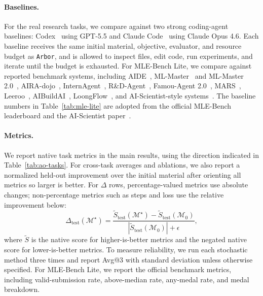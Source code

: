 \documentclass[]{selfevolagent}
\theoremstyle{plain}
\theoremstyle{definition}
\theoremstyle{remark}
\newcommand{\arbor}{\texttt{Arbor}}
\newcommand{\Mat}{\mathcal{M}}
\newcommand{\test}{\mathrm{test}}
\begin{document}
\paragraph{Baselines.}
For the real research tasks, we compare against two strong coding-agent
baselines: Codex~\citep{codex} using GPT-5.5 and Claude Code~\citep{claudecode} using Claude Opus 4.6. Each
baseline receives the same initial material, objective, evaluator, and resource
budget as \arbor{}, and is allowed to inspect files, edit code, run experiments,
and iterate until the budget is exhausted. For MLE-Bench Lite, we compare
against reported benchmark systems, including AIDE~\citep{aide},
ML-Master~\citep{mlmaster} and ML-Master 2.0~\citep{mlmaster2},
AIRA-dojo~\citep{airadojo}, InternAgent~\citep{internagent},
R\&D-Agent~\citep{rdagent}, Famou-Agent 2.0~\citep{famouagent},
MARS~\citep{mars}, Leeroo~\citep{kapso},
AIBuildAI~\citep{aibuildai}, LoongFlow~\citep{loongflow}, and
AI-Scientist-style systems~\citep{aiscientist,aiscientist_long}. The baseline numbers in Table~\ref{tab:mle-lite} are adopted from the
official MLE-Bench leaderboard and the AI-Scientist paper~\cite{aiscientist_long}.

\paragraph{Metrics.}
We report native task metrics in the main results, using the direction indicated
in Table~\ref{tab:ao-tasks}. For cross-task averages and ablations, we also
report a normalized held-out improvement over the initial material after
orienting all metrics so larger is better. For $\Delta$ rows,
percentage-valued metrics use absolute changes; non-percentage metrics such as
steps and loss use the relative improvement below:
\[
  \Delta_{\test}(\Mat^\star)
  = \frac{\tilde{S}_{\test}(\Mat^\star)-\tilde{S}_{\test}(\Mat_0)}
         {|\tilde{S}_{\test}(\Mat_0)|+\epsilon},
\]
where $\tilde{S}$ is the native score for higher-is-better metrics and the
negated native score for lower-is-better metrics. To measure reliability, we run
each stochastic method three times and report Avg@3 with standard deviation
unless otherwise specified. For MLE-Bench Lite, we report the official benchmark
metrics, including valid-submission rate, above-median rate, any-medal rate, and
medal breakdown.
\end{document}
